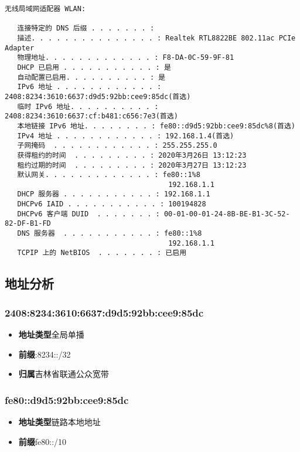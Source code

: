 \documentclass[blue,normal,cn]{elegantnote}
\begin{document}
\begin{lstlisting}
无线局域网适配器 WLAN:

   连接特定的 DNS 后缀 . . . . . . . :
   描述. . . . . . . . . . . . . . . : Realtek RTL8822BE 802.11ac PCIe Adapter
   物理地址. . . . . . . . . . . . . : F8-DA-0C-59-9F-81
   DHCP 已启用 . . . . . . . . . . . : 是
   自动配置已启用. . . . . . . . . . : 是
   IPv6 地址 . . . . . . . . . . . . : 2408:8234:3610:6637:d9d5:92bb:cee9:85dc(首选)
   临时 IPv6 地址. . . . . . . . . . : 2408:8234:3610:6637:cf:b481:c656:7e3(首选)
   本地链接 IPv6 地址. . . . . . . . : fe80::d9d5:92bb:cee9:85dc%8(首选)
   IPv4 地址 . . . . . . . . . . . . : 192.168.1.4(首选)
   子网掩码  . . . . . . . . . . . . : 255.255.255.0
   获得租约的时间  . . . . . . . . . : 2020年3月26日 13:12:23
   租约过期的时间  . . . . . . . . . : 2020年3月27日 13:12:23
   默认网关. . . . . . . . . . . . . : fe80::1%8
                                       192.168.1.1
   DHCP 服务器 . . . . . . . . . . . : 192.168.1.1
   DHCPv6 IAID . . . . . . . . . . . : 100194828
   DHCPv6 客户端 DUID  . . . . . . . : 00-01-00-01-24-8B-BE-B1-3C-52-82-DF-B1-FD
   DNS 服务器  . . . . . . . . . . . : fe80::1%8
                                       192.168.1.1
   TCPIP 上的 NetBIOS  . . . . . . . : 已启用
\end{lstlisting}

\subsection{地址分析}

\subsubsection{2408:8234:3610:6637:d9d5:92bb:cee9:85dc}

\begin{itemize}
	\item \textbf{地址类型}\quad 全局单播
	\item \textbf{前缀}:8234::/32
	\item \textbf{归属}\quad 吉林省联通公众宽带
\end{itemize}

\subsubsection{fe80::d9d5:92bb:cee9:85dc}

\begin{itemize}
	\item \textbf{地址类型}\quad 链路本地地址
	\item \textbf{前缀}\quad  fe80::/10
\end{itemize}
\end{document}
